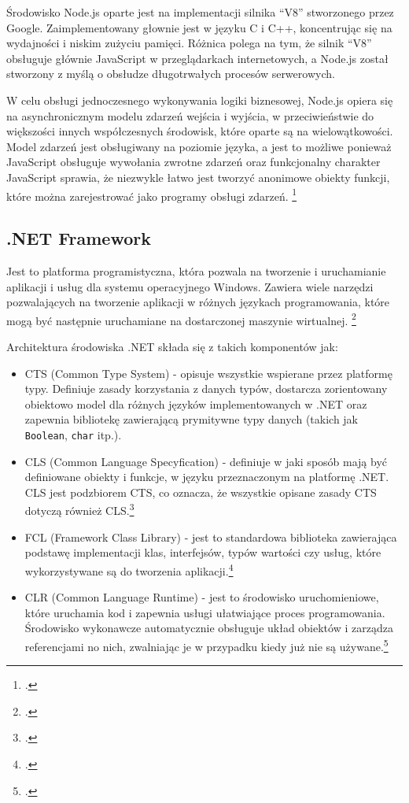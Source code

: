 \par Środowisko Node.js oparte jest na implementacji silnika ``V8'' stworzonego przez Google. Zaimplementowany głownie jest w języku C i C++, koncentrując się na wydajności i niskim zużyciu pamięci. Różnica polega na tym, że silnik ``V8'' obsługuje głównie JavaScript w przeglądarkach internetowych, a Node.js został stworzony z myślą o obsłudze długotrwałych procesów serwerowych.
\par W celu obsługi jednoczesnego wykonywania logiki biznesowej, Node.js opiera się na asynchronicznym modelu zdarzeń wejścia i wyjścia, w przeciwieństwie do większości innych współczesnych środowisk, które oparte są na wielowątkowości. Model zdarzeń jest obsługiwany na poziomie języka, a jest to możliwe ponieważ JavaScript obsługuje wywołania zwrotne zdarzeń oraz funkcjonalny charakter JavaScript sprawia, że niezwykle łatwo jest tworzyć anonimowe obiekty funkcji, które można zarejestrować jako programy obsługi zdarzeń. \footcite{Tilkov2010}

\subsection{.NET Framework}
\par Jest to platforma programistyczna, która pozwala na tworzenie i uruchamianie aplikacji i usług dla systemu operacyjnego Windows. Zawiera wiele narzędzi pozwalających na tworzenie aplikacji w różnych językach programowania, które mogą być następnie uruchamiane na dostarczonej maszynie wirtualnej. \footcite{dotNetFr}

\par Architektura środowiska .NET składa się z takich komponentów jak:
\begin{itemize}
  \item CTS (Common Type System) - opisuje wszystkie wspierane przez platformę typy. Definiuje zasady korzystania z danych typów, dostarcza zorientowany obiektowo model dla różnych języków implementowanych w .NET oraz zapewnia bibliotekę zawierającą prymitywne typy danych (takich jak \texttt{Boolean}, \texttt{char} itp.).
  \item CLS (Common Language Specyfication) - definiuje w jaki sposób mają być definiowane obiekty i funkcje, w języku przeznaczonym na platformę .NET. CLS jest podzbiorem CTS, co oznacza, że wszystkie opisane zasady CTS dotyczą również CLS.\footcite{dotNetCLS}
  \item FCL (Framework Class Library) - jest to standardowa biblioteka zawierająca podstawę implementacji klas, interfejsów, typów wartości czy usług, które wykorzystywane są do tworzenia aplikacji.\footcite{dotNetFCL}
  \item CLR (Common Language Runtime) - jest to środowisko uruchomieniowe, które uruchamia kod i zapewnia usługi ułatwiające proces programowania. Środowisko wykonawcze automatycznie obsługuje układ obiektów i zarządza referencjami no nich, zwalniając je w przypadku kiedy już nie są używane.\footcite{dotNetCLR}
\end{itemize}

